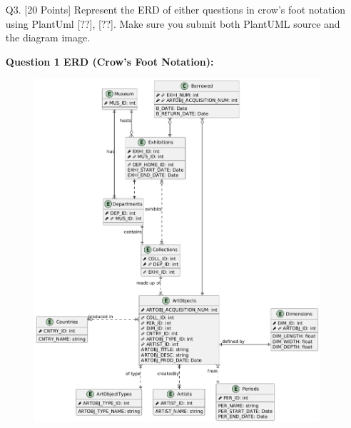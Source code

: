 \documentclass[12pt]{article}
\begin{document}
\begin{spacing}{1.5}
\begin{enumerate}
\begin{enumerate}
                              \inputminted[bgcolor=Beige, frame=lines, fontsize=\small, linenos, breaklines]{sql}{q2/seed.sql}

                  \end{enumerate}

                  \newpage

            \item[Q3.] [20 Points] Represent the ERD of either questions in crow's foot notation using PlantUml [??], [??]. Make sure you submit both PlantUML source and the diagram image.

                  \textbf{Question 1 ERD (Crow's Foot Notation):}

                  \begin{figure}[h!]
                        \centering
                        \includegraphics[width=1\textwidth]{diagrams/out/q1a(crow).png}
                  \end{figure}

      \end{enumerate}

\end{spacing}
\end{document}
